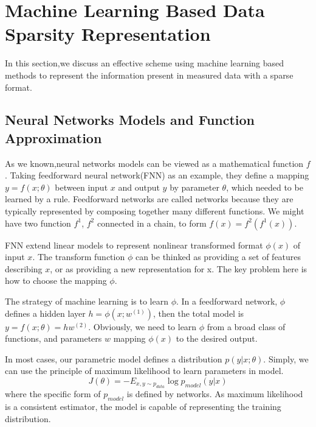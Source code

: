 \section{Machine Learning Based Data Sparsity Representation}

In this section,we discuss an effective scheme using machine learning based methods to represent the information present in measured data with a sparse format.

\subsection{Neural Networks Models and Function Approximation}
As we known,neural networks models can be viewed as a mathematical function $f$. Taking feedforward neural network(FNN) as an example, they define a mapping ${{y}}=f(x;\theta )$ between input $x$ and output $y$ by parameter $\theta$, which needed to be learned by a rule. Feedforward networks are called networks because they are typically represented by composing together many different functions. We might have two function $f^{1}$, $f^{2}$ connected in a chain\cite{goodfellow2016deep}, to form
$f(x) = f^{2}(f^{1}(x))$.

FNN extend linear models to represent nonlinear transformed format $\phi(x)$ of input $x$. The transform function $\phi$ can be thinked as providing a set of features describing $x$, or as providing a new representation for x. The key problem here is how to choose the mapping $\phi$.

The strategy of machine learning is to learn $\phi$. In a feedforward network, $\phi$ defines a hidden layer $h=\phi(x;w^{(1)})$, then the total model is $y=f(x;\theta)=hw^{(2)}$.
Obviously, we need to learn $\phi$ from a broad class of functions, and parameters $w$ mapping $\phi(x)$ to the desired output.

In most cases, our parametric model defines a distribution $p(y|x;\theta)$. Simply, we can use the principle of maximum likelihood to learn parameters in model.
\begin{equation}
J(\theta ) =  - {E_{x,y \sim {p_{data}}}}\log {p_{model}}(y|x)
\end{equation}
where the specific form of $p_{model}$ is defined by networks.
As maximum likelihood is a consistent estimator, the model is capable of representing the training distribution.

